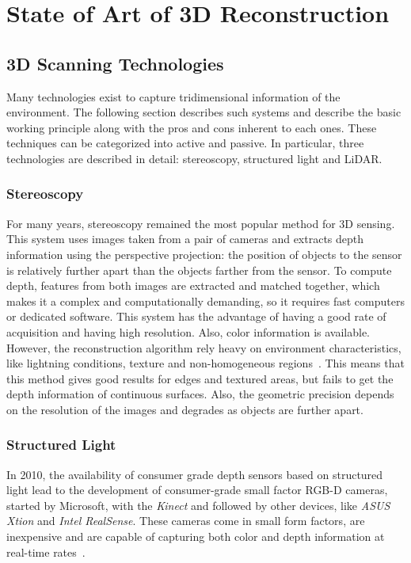 \chapter{State of Art of 3D Reconstruction}

\section{3D Scanning Technologies}

Many technologies exist to capture tridimensional information of the environment. The following section describes such systems and describe the basic working principle along with the pros and cons inherent to each ones. These techniques can be categorized into active and passive\cite{mada03}. In particular, three technologies are described in detail: stereoscopy, structured light and LiDAR.

\subsection{Stereoscopy}

For many years, stereoscopy remained the most popular method for 3D sensing. This system uses images taken from a pair of cameras and extracts depth information using the perspective projection: the position of objects to the sensor is relatively further apart than the objects farther from the sensor. To compute depth, features from both images are extracted and matched together, which makes it a complex and computationally demanding, so it requires fast computers or dedicated software. This system has the advantage of having a good rate of acquisition and having high resolution. Also, color information is available. However, the reconstruction algorithm rely heavy on environment characteristics, like lightning conditions, texture and non-homogeneous regions~\cite{klimentjew10}. This means that this method gives good results for edges and textured areas, but fails to get the depth information of continuous surfaces. Also, the geometric precision depends on the resolution of the images and degrades as objects are further apart.

\subsection{Structured Light}

In 2010, the availability of consumer grade depth sensors based on structured light lead to the development of consumer-grade small factor RGB-D cameras, started by Microsoft, with the \textit{Kinect} and followed by other devices, like \textit{ASUS Xtion} and \textit{Intel RealSense}. These cameras come in small form factors, are inexpensive and are capable of capturing both color and depth information at real-time rates~\cite{zollhoefer18}.

